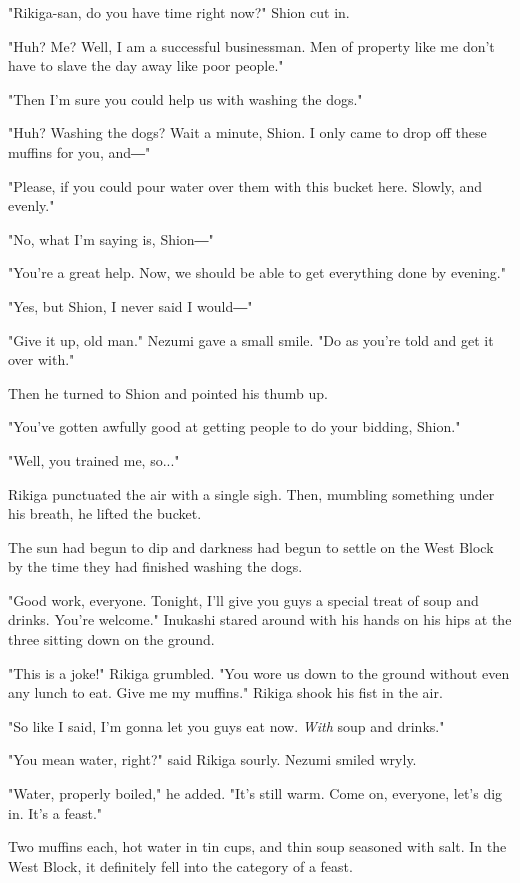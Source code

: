 "Rikiga-san, do you have time right now?" Shion cut in.

"Huh? Me? Well, I am a successful businessman. Men of property like me
don't have to slave the day away like poor people."

"Then I'm sure you could help us with washing the dogs."

"Huh? Washing the dogs? Wait a minute, Shion. I only came to drop off
these muffins for you, and―"

"Please, if you could pour water over them with this bucket here.
Slowly, and evenly."

"No, what I'm saying is, Shion―"

"You're a great help. Now, we should be able to get everything done by
evening."

"Yes, but Shion, I never said I would―"

"Give it up, old man." Nezumi gave a small smile. "Do as you're told and
get it over with."

Then he turned to Shion and pointed his thumb up.

"You've gotten awfully good at getting people to do your bidding,
Shion."

"Well, you trained me, so..."

Rikiga punctuated the air with a single sigh. Then, mumbling something
under his breath, he lifted the bucket.

\myspace

The sun had begun to dip and darkness had begun to settle on the West
Block by the time they had finished washing the dogs.

"Good work, everyone. Tonight, I'll give you guys a special treat of
soup and drinks. You're welcome." Inukashi stared around with his hands
on his hips at the three sitting down on the ground.

"This is a joke!" Rikiga grumbled. "You wore us down to the ground
without even any lunch to eat. Give me my muffins." Rikiga shook his
fist in the air.

"So like I said, I'm gonna let you guys eat now. \emph{With} soup and drinks."

"You mean water, right?" said Rikiga sourly. Nezumi smiled wryly.

"Water, properly boiled," he added. "It's still warm. Come on, everyone,
let's dig in. It's a feast."

Two muffins each, hot water in tin cups, and thin soup seasoned with
salt. In the West Block, it definitely fell into the category of a
feast.

